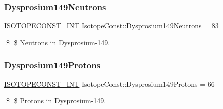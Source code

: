 \subsubsection{\texorpdfstring{Dysprosium149\+Neutrons}{Dysprosium149Neutrons}}
{\footnotesize\ttfamily \mbox{\hyperlink{group___isotope_const-_macros_ga5f18360b3e99483a35c32d789e62621c}{I\+S\+O\+T\+O\+P\+E\+C\+O\+N\+S\+T\+\_\+\+I\+NT}} Isotope\+Const\+::\+Dysprosium149\+Neutrons = 83}

\$ \$ Neutrons in Dysprosium-\/149. \mbox{\label{group___isotope_const-_dysprosium-_dy149_gaf5c8e9b77e05ec4b90d06f9c7c3c0811}} 
\subsubsection{\texorpdfstring{Dysprosium149\+Protons}{Dysprosium149Protons}}
{\footnotesize\ttfamily \mbox{\hyperlink{group___isotope_const-_macros_ga5f18360b3e99483a35c32d789e62621c}{I\+S\+O\+T\+O\+P\+E\+C\+O\+N\+S\+T\+\_\+\+I\+NT}} Isotope\+Const\+::\+Dysprosium149\+Protons = 66}

\$ \$ Protons in Dysprosium-\/149. 